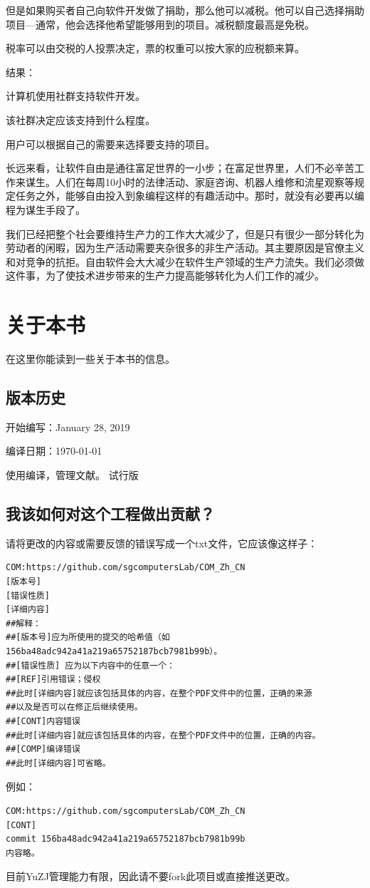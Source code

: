 但是如果购买者自己向软件开发做了捐助，那么他可以减税。他可以自己选择捐助项目—通常，他会选择他希望能够用到的项目。减税额度最高是免税。\par
税率可以由交税的人投票决定，票的权重可以按大家的应税额来算。\par
结果：\par
计算机使用社群支持软件开发。\par
该社群决定应该支持到什么程度。\par
用户可以根据自己的需要来选择要支持的项目。\par
长远来看，让软件自由是通往富足世界的一小步；在富足世界里，人们不必辛苦工作来谋生。人们在每周10小时的法律活动、家庭咨询、机器人维修和流星观察等规定任务之外，能够自由投入到象编程这样的有趣活动中。那时，就没有必要再以编程为谋生手段了。\par
我们已经把整个社会要维持生产力的工作大大减少了，但是只有很少一部分转化为劳动者的闲暇，因为生产活动需要夹杂很多的非生产活动。其主要原因是官僚主义和对竞争的抗拒。自由软件会大大减少在软件生产领域的生产力流失。我们必须做这件事，为了使技术进步带来的生产力提高能够转化为人们工作的减少。
\section{关于本书}
在这里你能读到一些关于本书的信息。
\subsection{版本历史}
开始编写：January 28, 2019\par
编译日期：\today \par
使用\XeLaTeX 编译，\BIBTEX 管理文献。
试行版
\subsection{我该如何对这个工程做出贡献？}
请将更改的内容或需要反馈的错误写成一个txt文件，它应该像这样子：
\begin{verbatim}
COM:https://github.com/sgcomputersLab/COM_Zh_CN
[版本号]
[错误性质]
[详细内容]
##解释：
##[版本号]应为所使用的提交的哈希值（如156ba48adc942a41a219a65752187bcb7981b99b）。
##[错误性质] 应为以下内容中的任意一个：
##[REF]引用错误；侵权
##此时[详细内容]就应该包括具体的内容，在整个PDF文件中的位置，正确的来源
##以及是否可以在修正后继续使用。
##[CONT]内容错误
##此时[详细内容]就应该包括具体的内容，在整个PDF文件中的位置，正确的内容。
##[COMP]编译错误
##此时[详细内容]可省略。
\end{verbatim} \par
例如：
\begin{verbatim}
COM:https://github.com/sgcomputersLab/COM_Zh_CN
[CONT]
commit 156ba48adc942a41a219a65752187bcb7981b99b
内容略。
\end{verbatim} \par
目前YuZJ管理能力有限，因此请不要fork此项目或直接推送更改。
